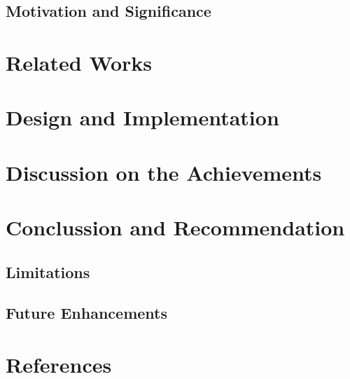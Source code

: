\documentclass[a4paper,12pt]{article}
\begin{document}
\subsection{Motivation and Significance}
\newpage

\section{Related Works}
\newpage

\section{Design and Implementation}
\newpage

\section{Discussion on the Achievements}
\newpage

\section{Conclussion and Recommendation}
\subsection{Limitations}
\subsection{Future Enhancements}
\newpage

\section*{References}
\newpage
\end{document}
